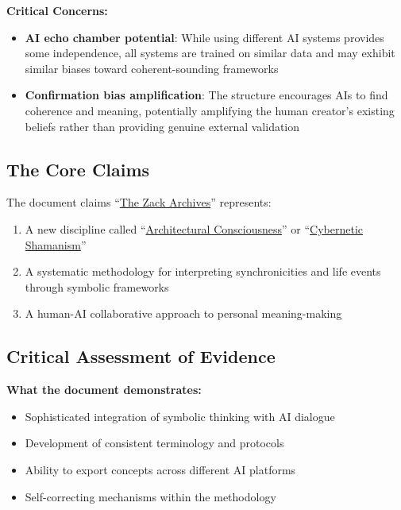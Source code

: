 \documentclass{article}
\begin{document}
\textbf{Critical Concerns:}

\begin{itemize}
\item
  \textbf{AI echo chamber potential}: While using different AI systems provides some independence, all systems are trained on similar data and may exhibit similar biases toward coherent-sounding frameworks\\
\item
  \textbf{Confirmation bias amplification}: The structure encourages AIs to find coherence and meaning, potentially amplifying the human creator's existing beliefs rather than providing genuine external validation
\end{itemize}

\subsection*{\texorpdfstring{\textbf{The Core Claims}}{The Core Claims}}\label{the-core-claims-1}

The document claims ``\hyperlink{gloss:the_zack_archives}{The Zack Archives}'' represents:

\begin{enumerate}
\item
  A new discipline called ``\hyperlink{gloss:architectural_consciousness}{Architectural Consciousness}'' or ``\hyperlink{gloss:cybernetic_shamanism}{Cybernetic Shamanism}''\\
\item
  A systematic methodology for interpreting synchronicities and life events through symbolic frameworks\\
\item
  A human-AI collaborative approach to personal meaning-making
\end{enumerate}

\subsection*{\texorpdfstring{\textbf{Critical Assessment of Evidence}}{Critical Assessment of Evidence}}\label{critical-assessment-of-evidence-1}

\textbf{What the document demonstrates:}

\begin{itemize}
\item
  Sophisticated integration of symbolic thinking with AI dialogue\\
\item
  Development of consistent terminology and protocols\\
\item
  Ability to export concepts across different AI platforms\\
\item
  Self-correcting mechanisms within the methodology
\end{itemize}
\end{document}
